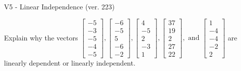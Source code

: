 \begin{exercise}
  \begin{exerciseTitle}V5 - Linear Independence (ver. 223)\end{exerciseTitle}
  \begin{exerciseStatement}
    Explain why the vectors \(\left[\begin{array}{r}
-5 \\
-3 \\
-5 \\
-4 \\
-5
\end{array}\right] , \left[\begin{array}{r}
-6 \\
-5 \\
5 \\
-6 \\
-2
\end{array}\right] , \left[\begin{array}{r}
4 \\
-5 \\
2 \\
-3 \\
1
\end{array}\right] , \left[\begin{array}{r}
37 \\
19 \\
2 \\
27 \\
22
\end{array}\right] , \text{ and } \left[\begin{array}{r}
1 \\
-4 \\
-4 \\
-2 \\
2
\end{array}\right]\) are linearly dependent or linearly independent.	



\end{exerciseStatement}
\end{exercise}
